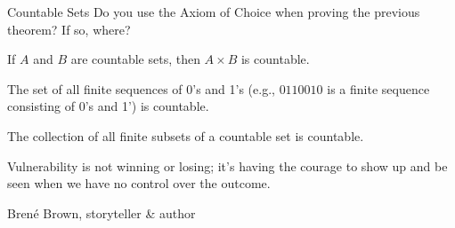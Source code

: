 \begin{section}{Countable Sets}
Do you use the Axiom of Choice when proving the previous theorem?  If so, where?

\begin{theorem}
If $A$ and $B$ are countable sets, then $A\times B$ is countable.
\end{theorem}

\begin{theorem}
The set of all finite sequences of 0's and 1's (e.g., $0110010$ is a finite sequence consisting of 0's and 1') is countable. 
\end{theorem}

\begin{theorem}
The collection of all finite subsets of a countable set is countable.
\end{theorem}

\epigraph{Vulnerability is not winning or losing; it's having the courage to show up and be seen when we have no control over the outcome.}{Bren\'e Brown, storyteller \& author}

\end{section}